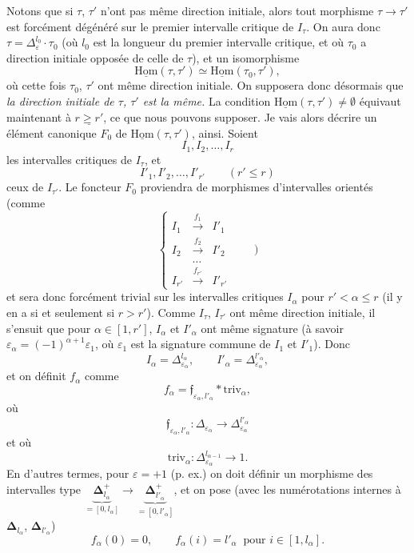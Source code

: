 \documentclass[11pt]{article}
\newcommand{\msp}[1]{\marginpar{\footnotesize [#1]}}
\newcommand{\uHom}{\underline{\mathrm{Hom}}}
\newcommand{\triv}{\mathrm{triv}}
\begin{document}
Notons que si $\tau$, $\tau'$ n'ont pas même direction initiale, alors tout morphisme $\tau\longrightarrow\tau'$ est forcément dégénéré sur le premier intervalle critique de $I_\tau$. On aura donc $\tau=\Delta_\varepsilon^{l_0}\cdot\tau_0$ (où $l_0$ est la longueur du premier intervalle critique, et où $\tau_0$ a direction initiale opposée de celle de $\tau$), et un isomorphisme
\[
\uHom(\tau,\tau')\simeq\uHom(\tau_0,\tau'),
\]
où cette fois $\tau_0$, $\tau'$ ont même direction initiale. On supposera donc désormais que \textit{la direction initiale de $\tau$, $\tau'$ est la même.} La condition $\uHom(\tau,\tau')\neq\emptyset$ équivaut maintenant à $\underline{r\geq r'}$, ce que nous pouvons supposer. Je vais alors décrire un élément canonique
\msp{page 85}
$F_0$ de $\uHom(\tau,\tau')$, ainsi. Soient
\[
I_1,I_2,\dots,I_r
\]
les intervalles critiques de $I_\tau$, et
\[
I'_1,I'_2,\dots,I'_{r'}\qquad(r'\leq r)
\]
ceux de $I_{\tau'}$. Le foncteur $F_0$ proviendra de morphismes d'intervalles orientés (comme
\[
\left\{
\begin{array}{ccc}
I_1 & \xrightarrow{f_1} & I'_1\\[4pt]
I_2 & \xrightarrow{f_2} & I'_2\\[4pt]
 & \dots & \\[4pt]
I_{r'} & \xrightarrow{f_{r'}} & I'_{r'}
\end{array}
\right.\qquad)
\]
et sera donc forcément trivial sur les intervalles critiques $I_\alpha$ pour $r'<\alpha\leq r$ (il y en a si et seulement si $r>r'$). Comme $I_\tau$, $I_{\tau'}$ ont même direction initiale, il s'ensuit que pour $\alpha\in[1,r']$, $I_\alpha$ et $I'_\alpha$ ont même signature (à savoir $\varepsilon_\alpha=(-1)^{\alpha+1}\varepsilon_1$, où $\varepsilon_1$ est la signature commune de $I_1$ et $I'_1$). Donc
\[
I_\alpha=\Delta^{l_\alpha}_{\varepsilon_\alpha},\qquad I'_\alpha=\Delta^{l'_\alpha}_{\varepsilon_\alpha},
\]
et on définit $f_\alpha$ comme
\[
f_\alpha=\mathfrak{f}_{\varepsilon_\alpha,l'_\alpha}*\triv_\alpha,
\]
où
\[
\mathfrak{f}_{\varepsilon_\alpha,l'_\alpha}:\Delta_{\varepsilon_\alpha}\longrightarrow\Delta^{l'_\alpha}_{\varepsilon_\alpha}
\]
et où
\[
\triv_\alpha:\Delta^{l_{\alpha-1}}_{\varepsilon_\alpha}\longrightarrow1. %
\]
En d'autres termes, pour $\varepsilon=+1$ (p. ex.) on doit définir un morphisme des intervalles type $\underbrace{\mathbf{\Delta}^+_{l_\alpha}}_{=[0,l_\alpha]}\longrightarrow\underbrace{\mathbf{\Delta}^+_{l'_\alpha}}_{=[0,l'_\alpha]}$, et on pose (avec les numérotations internes à $\mathbf{\Delta}_{l_\alpha}$, $\mathbf{\Delta}_{l'_\alpha}$)
\[
f_\alpha(0)=0,\qquad f_\alpha(i)=l'_\alpha\ \text{ pour }i\in[1,l_\alpha].
\]
\end{document}
